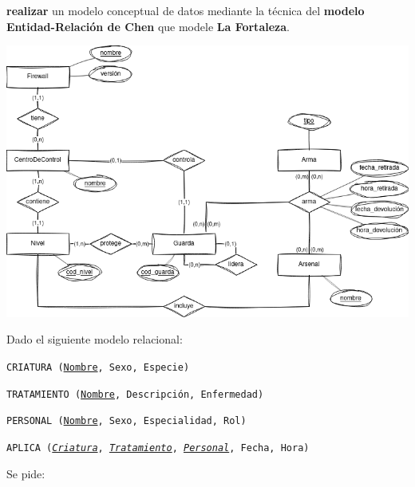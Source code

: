 \documentclass[
    12pt,
    a4paper,
    addpoints,
    answers,
    convocatoria=ord,
    titulacion=CD,
    curso=2023/2024,
]{db-exam}
\begin{document}
\begin{questions}
\begin{parts}
\textbf{realizar} un modelo conceptual de datos mediante la técnica del \textbf{modelo Entidad-Relación de Chen} que modele \textbf{La Fortaleza}.


\begin{solution}
    \includegraphics[width=\textwidth]{figs/bbdd-cdia-2023-2024-ordinaria/2024-ordinaria-gcdia-mer.png}
\end{solution}
\end{parts}


\newpage
{}

Dado el siguiente modelo relacional:

\texttt{CRIATURA (\underline{Nombre}, Sexo, Especie)}

\texttt{TRATAMIENTO (\underline{Nombre}, Descripción, Enfermedad)}

\texttt{PERSONAL (\underline{Nombre}, Sexo, Especialidad, Rol)}

\texttt{APLICA (\underline{\emph{Criatura}}, \underline{\emph{Tratamiento}}, \underline{\emph{Personal}}, Fecha, Hora)}

Se pide:
\end{questions}
\end{document}
